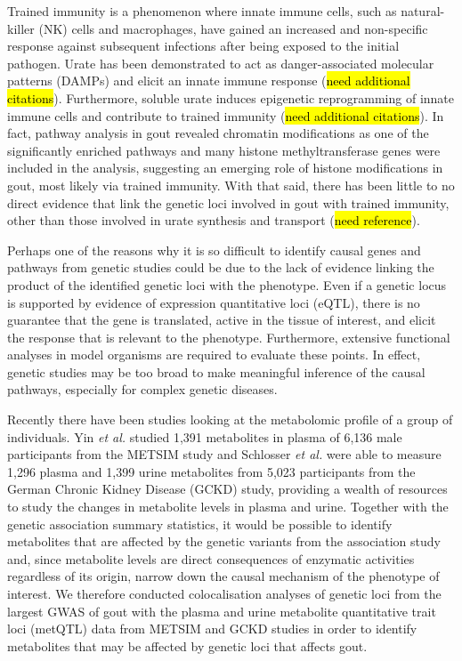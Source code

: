 \documentclass[a4paper,10pt]{article}
\begin{document}
Trained immunity is a phenomenon where innate immune cells, such as natural-killer (NK) cells and macrophages, have gained an increased and non-spec\-ific response against subsequent infections after being exposed to the initial pathogen\citep{netea_trained_2011}.
Urate has been demonstrated to act as danger-associated molecular patterns (DAMPs) and elicit an innate immune response\citep{cabau_urate-induced_2020} (\hl{need additional citations}).
Furthermore, soluble urate induces epigenetic reprogramming of innate immune cells and contribute to trained immunity\citep{cabau_urate-induced_2020} (\hl{need additional citations}).
In fact, pathway analysis in gout revealed chromatin modifications as one of the significantly enriched pathways and many histone methyltransferase genes were included in the analysis\citep{major_genome-wide_2022}, suggesting an emerging role of histone modifications in gout, most likely via train\-ed immunity.
With that said, there has been little to no direct evidence that link the genetic loci involved in gout with trained immunity, other than those involved in urate synthesis and transport (\hl{need reference}).

Perhaps one of the reasons why it is so difficult to identify causal genes and pathways from genetic studies could be due to the lack of evidence linking the product of the identified genetic loci with the phenotype.
Even if a genetic locus is supported by evidence of expression quantitative loci (eQTL), there is no guarantee that the gene is translated, active in the tissue of interest, and elicit the response that is relevant to the phenotype.
Furthermore, extensive functional analyses in model organisms are required to evaluate these points.
In effect, genetic studies may be too broad to make meaningful inference of the causal pathways, especially for complex genetic diseases.

Recently there have been studies looking at the metabolomic profile of a group of individuals.
Yin \textit{et al.}\citep{yin_genome-wide_2022} studied 1,391 metabolites in plasma of 6,136 male participants from the METSIM study and Schlosser \textit{et al.} were able to measure 1,296 plasma and 1,399 urine metabolites from 5,023 participants from the German Chronic Kidney Disease (GCKD) study, providing a wealth of resources to study the changes in metabolite levels in plasma and urine.
Together with the genetic association summary statistics, it would be possible to identify metabolites that are affected by the genetic variants from the association study and, since metabolite levels are direct consequences of enzymatic activities regardless of its origin, narrow down the causal mechanism of the phenotype of interest.
We therefore conducted colocalisation analyses of genetic loci from the largest GWAS of gout with the plasma and urine metabolite quantitative trait loci (metQTL) data from METSIM and GCKD studies in order to identify meta\-bolites that may be affected by genetic loci that affects gout.
\end{document}
